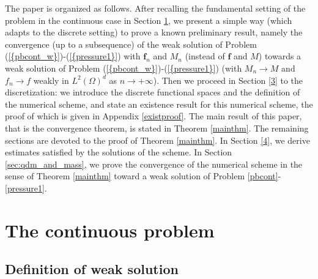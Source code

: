 \documentclass{amsart}
\numberwithin{equation}{section}
\begin{document}
\medskip
The paper is organized as follows.
After recalling the fundamental setting of the problem in the continuous case in Section \ref{2}, we present a simple way (which adapts to the discrete setting) to prove a known preliminary result, namely the convergence (up to a subsequence) of the weak solution of Problem {(\ref{{pbcont_w}})}-{(\ref{{pressure1}})} with $ \bm{f}_n $ and $M_n$ (instead of $ \bm{f}$ and $M$) towards a weak solution of Problem {(\ref{{pbcont_w}})}-{(\ref{{pressure1}})} (with $M_n \to M$ and $f_n \to f$ weakly in
$L^2(\Omega)^d$ as ${{n {\rightarrow} + \infty}}$).
Then we proceed in Section \ref{3} to the discretization: we introduce the discrete functional spaces and the definition of the numerical scheme, and state an existence result for this numerical scheme, the proof of which is given in Appendix \ref{existproof}.
The main result of this paper, that is the convergence theorem, is stated in Theorem \ref{mainthm}.
The remaining sections are devoted to the proof of Theorem \ref{mainthm}.
In Section \ref{4}, we derive estimates satisfied by the solutions of the scheme. 
In Section \ref{sec:qdm_and_mass}, we prove the convergence of the numerical scheme in the sense of Theorem \ref{mainthm} toward a weak solution of Problem \eqref{pbcont}-\eqref{pressure1}.

\section{The continuous problem}\label{2}

\subsection{Definition of weak solution}
\end{document}
